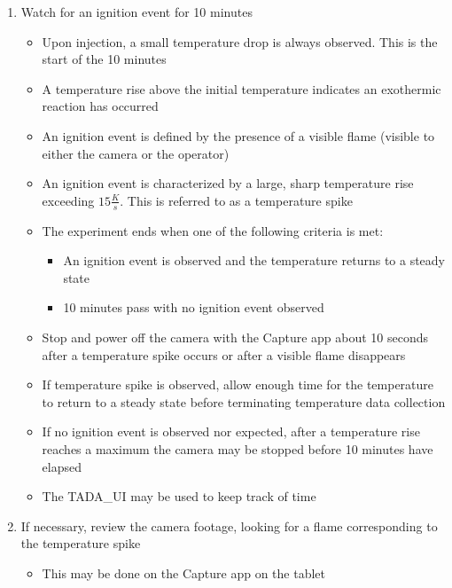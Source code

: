 \documentclass[letterpaper,11pt]{article}
\begin{document}
\begin{enumerate}
    \item Watch for an ignition event for 10 minutes
        \begin{itemize}
        \item Upon injection, a small temperature drop is always observed. This
            is the start of the 10 minutes
        \item A temperature rise above the initial temperature indicates an 
            exothermic reaction has occurred
        \item An ignition event is defined by the presence of a visible flame
            (visible to either the camera or the operator)
        \item An ignition event is characterized by a large, sharp temperature 
            rise exceeding $15 \frac{K}{s}$. This is referred to as
            a temperature spike
        \item The experiment ends when one of the following criteria is met:
            \begin{itemize} 
            \item An ignition event is observed and the temperature returns to 
                a steady state
            \item 10 minutes pass with no ignition event observed
            \end{itemize}
        \item Stop and power off the camera with the Capture app about 10 
            seconds after a temperature spike occurs or after a visible flame 
            disappears
        \item If temperature spike is observed, allow enough time for the
            temperature to return to a steady state before terminating 
            temperature data collection
		\item If no ignition event is observed nor expected, after a 
            temperature rise reaches a maximum the camera may be stopped 
            before 10 minutes have elapsed
        \item The TADA\_UI may be used to keep track of time
        \end{itemize}
    
    \item If necessary, review the camera footage, looking for a flame 
        corresponding to the temperature spike
        \begin{itemize}
        \item This may be done on the Capture app on the tablet
        \end{itemize}
    

\end{enumerate}
\end{document}

